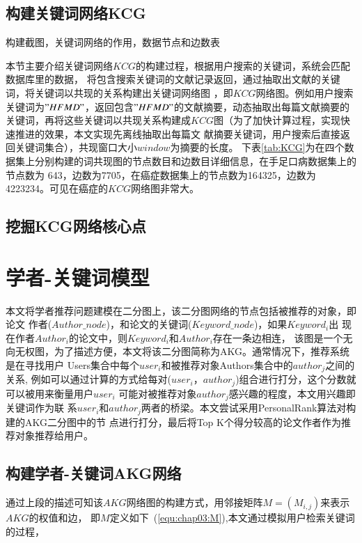 \subsection{构建关键词网络KCG}
构建截图，关键词网络的作用，数据节点和边数表%

本节主要介绍关键词网络$KCG$的构建过程，根据用户搜索的关键词，系统会匹配数据库里的数据，%
将包含搜索关键词的文献记录返回，通过抽取出文献的关键词，将关键词以共现的关系构建出关键词网络图%
，即$KCG$网络图。例如用户搜索关键词为$"HFMD"$，返回包含$"HFMD"$的文献摘要，动态抽取出每篇文献摘要的%
关键词，再将这些关键词以共现关系构建成$KCG$图（为了加快计算过程，实现快速推进的效果，本文实现先离线抽取出每篇文%
献摘要关键词，用户搜索后直接返回关键词集合），共现窗口大小$window$为摘要的长度。%
下表\ref{tab:KCG}为在四个数据集上分别构建的词共现图的节点数目和边数目详细信息，在手足口病数据集上的节点数为%
643，边数为7705，在癌症数据集上的节点数为164325，边数为4223234。可见在癌症的$KCG$网络图非常大。%



\subsection{挖掘KCG网络核心点}



\section{学者-关键词模型}

本文将学者推荐问题建模在二分图上，该二分图网络的节点包括被推荐的对象，即论文%
作者($Author\_node$)，和论文的关键词($Keyword\_node$)，如果$Keyword_i$出%
现在作者$Author_i$的论文中，则$Keyword_i$和$Author_i$存在一条边相连，%
该图是一个无向无权图，为了描述方便，本文将该二分图简称为AKG。通常情况下，推荐系统是在寻找用户%
Users集合中每个$user_i$和被推荐对象Authors集合中的$author_j$之间的关系,%
例如可以通过计算的方式给每对($user_i$，$author_j$)组合进行打分，这个分数就可以被用来衡量用户$user_i$%
可能对被推荐对象$author_j$感兴趣的程度，本文用兴趣即关键词作为联%
系$user_i$和$author_j$两者的桥梁。本文尝试采用PersonalRank算法对构建的AKG二分图中的节
点进行打分，最后将Top K个得分较高的论文作者作为推荐对象推荐给用户。%

\subsection{构建学者-关键词AKG网络}
通过上段的描述可知该$AKG$网络图的构建方式，用邻接矩阵$M=(M_{i,j})$来表示$AKG$的权值和边，%
即$M$定义如下~(\ref{equ:chap03:M}),本文通过模拟用户检索关键词的过程，%

